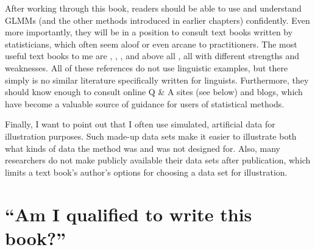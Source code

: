 After working through this book, readers should be able to use and understand GLMMs (and the other methods introduced in earlier chapters) confidently.
Even more importantly, they will be in a position to consult text books written by statisticians, which often seem aloof or even arcane to practitioners.
The most useful text books to me are \cite{FahrmeirEa2013}, \cite{Fox2016}, \cite{ZuurEa2009}, and above all \cite{GelmanHill2006}, all with different strengths and weaknesses.
All of these references do not use linguistic examples, but there simply is no similar literature specifically written for linguists.
Furthermore, they should know enough to consult online Q \& A sites (see below) and blogs, which have become a valuable source of guidance for users of statistical methods.

Finally, I want to point out that I often use simulated, artificial data for illustration purposes.
Such made-up data sets make it easier to illustrate both what kinds of data the method was and was not designed for.
Also, many researchers do not make publicly available their data sets after publication, which limits a text book's author's options for choosing a data set for illustration.


\section{``Am I qualified to write this book?''}

